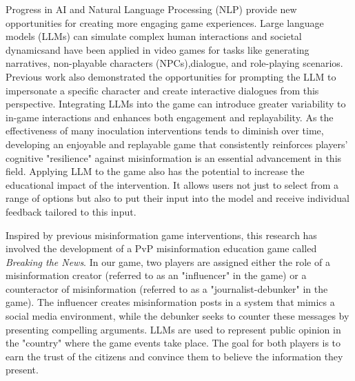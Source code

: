 

Progress in AI and Natural Language Processing (NLP) provide new opportunities for creating more engaging game experiences. Large language models (LLMs) can simulate complex human interactions and societal dynamics\cite{ziems2024can}and have been applied in video games for tasks like generating narratives\cite{park2023generative}, non-playable characters (NPCs),dialogue\cite{ashby2023personalized,uludaugli2023non}, and role-playing scenarios\cite{xu2023exploring}. 
Previous work also demonstrated the opportunities for prompting the LLM to impersonate a specific character and create interactive dialogues from this perspective\cite{zhou2024eternagram,shao2023character}. Integrating LLMs into the game can introduce greater variability to in-game interactions and enhances both engagement and replayability. As the effectiveness of many inoculation interventions tends to diminish over time, developing an enjoyable and replayable game that consistently reinforces players' cognitive "resilience" against misinformation is an essential advancement in this field\cite{wells2024doomscroll}. Applying LLM to the game also has the potential to increase the educational impact of the intervention. It allows users not just to select from a range of options but also to put their input into the model and receive individual feedback tailored to this input.

Inspired by previous misinformation game interventions, this research has involved the development of a PvP misinformation education game called \textit{Breaking the News}. In our game, two players are assigned either the role of a misinformation creator (referred to as an "influencer" in the game) or a counteractor of misinformation (referred to as a "journalist-debunker" in the game). The influencer creates misinformation posts in a system that mimics a social media environment, while the debunker seeks to counter these messages by presenting compelling arguments. LLMs are used to represent public opinion in the "country" where the game events take place. The goal for both players is to earn the trust of the citizens and convince them to believe the information they present. 

